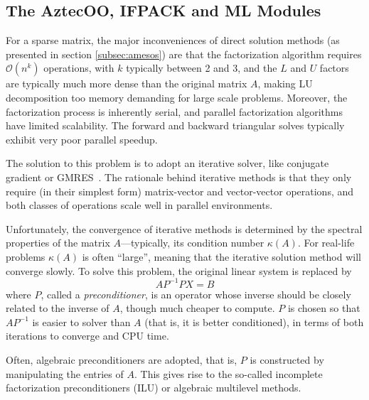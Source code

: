 \documentclass[acmtocl]{acmtrans2m}
\begin{document}
\subsection{The AztecOO, IFPACK and ML Modules}
\label{subsec:aztecoo_ifpack}

For a sparse matrix, the major inconveniences of direct solution
methods (as presented in section \ref{subsec:amesos}) are that the
factorization algorithm requires $\mathcal{O}(n^k)$ operations, with
$k$ typically between 2 and 3, and the $L$ and $U$ factors are
typically much more dense than the original matrix $A$, making LU
decomposition too memory demanding for large scale problems.
Moreover, the factorization process is inherently serial, and parallel
factorization algorithms have limited scalability.  The forward and
backward triangular solves typically exhibit very poor parallel
speedup.

The solution to this problem is to adopt an iterative solver, like
conjugate gradient or GMRES~\cite{golub96matrix}.  The rationale
behind iterative methods is that they only require (in their simplest
form) matrix-vector and vector-vector operations, and both classes of
operations scale well in parallel environments.

Unfortunately, the convergence of iterative methods is determined by
the spectral properties of the matrix $A$---typically, its condition
number $\kappa(A)$.  For real-life problems $\kappa(A)$ is often
``large'', meaning that the iterative solution method will converge
slowly.  To solve this problem, the original linear system is replaced
by
\[
A P^{-1} P X = B
\]
where $P$, called a {\sl preconditioner}, is an operator whose inverse
should be closely related to the inverse of $A$, though much cheaper
to compute.  $P$ is chosen so that $AP^{-1}$ is easier to solver than
$A$ (that is, it is better conditioned), in terms of both iterations
to converge and CPU time.

\smallskip

Often, algebraic preconditioners are adopted, that is, $P$ is
constructed by manipulating the entries of $A$.  This gives rise to
the so-called incomplete factorization preconditioners (ILU) or
algebraic multilevel methods.
\end{document}
